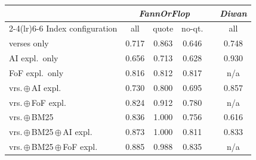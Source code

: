 \begin{tabular}{l ccc c c}
\toprule
& \multicolumn{3}{c}{\textit{FannOrFlop}} & & \textit{Diwan} \\
\cmidrule(lr){2-4}\cmidrule(lr){6-6}
Index configuration & all & quote & no-qt. & & all \\
\midrule
verses only & 0.717 & 0.863 & 0.646 & & 0.748 \\
AI expl.\ only & 0.656 & 0.713 & 0.628 & & 0.930 \\
FoF expl.\ only & 0.816 & 0.812 & 0.817 & & n/a \\
vrs.\,$\oplus$\,AI expl. & 0.730 & 0.800 & 0.695 & & 0.857 \\
vrs.\,$\oplus$\,FoF expl. & 0.824 & 0.912 & 0.780 & & n/a \\
vrs.\,$\oplus$\,BM25 & 0.836 & 1.000 & 0.756 & & 0.616 \\
vrs.\,$\oplus$\,BM25\,$\oplus$\,AI expl. & 0.873 & 1.000 & 0.811 & & 0.833 \\
vrs.\,$\oplus$\,BM25\,$\oplus$\,FoF expl. & 0.885 & 0.988 & 0.835 & & n/a \\
\bottomrule
\end{tabular}